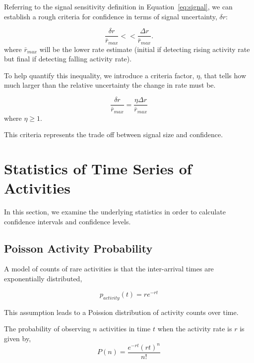 \documentclass{article}
\begin{document}
Referring to the signal sensitivity definition in Equation~\ref{eq:signal}, we can establish a rough criteria for confidence
in terms of signal uncertainty, $\delta r$:

\begin{equation}
    \label{eq:criteria}
    \frac{\delta r}{\bar{r}_{max}} << \frac{\Delta r}{\bar{r}_{max}}.
\end{equation}
where $\bar{r}_{max}$ will be the lower rate estimate (initial if detecting rising activity rate but final if detecting falling activity rate).

To help quantify this inequality, we introduce a criteria factor, $\eta$, that tells how much larger than the relative
uncertainty the change in rate must be.

\begin{equation}
    \label{eq:criteriaParam}
    \frac{\delta r}{\bar{r}_{max}} = \frac{\eta \Delta r}{\bar{r}_{max}}
\end{equation}
where $\eta \ge 1$.

This criteria represents the trade off between signal size and confidence.

\section{Statistics of Time Series of Activities} 

In this section, we examine the underlying statistics in order to calculate confidence intervals and confidence levels.

\subsection{Poisson Activity Probability} 

A model of counts of rare activities is that the inter-arrival times are exponentially distributed, 

\begin{equation}
    \label{eq:tbe}
    p_{activity}(t) = r e^{-r t}
\end{equation}

This assumption leads to a Poission distribution of activity counts over time.

The probability of observing $n$ activities in time $t$ when the activity rate is $r$ is given by,
\begin{equation}
    \label{eq:poisson}
    P(n) = \frac{e^{-r t} (r t)^n}{n!}
\end{equation}
\end{document}
